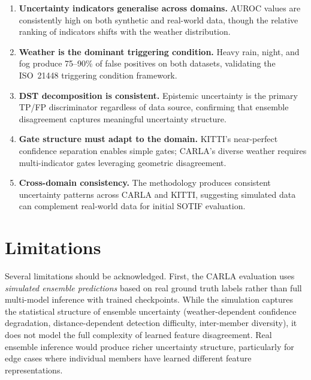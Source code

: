 \documentclass[conference]{IEEEtran}
\begin{document}
\begin{enumerate}
    \item \textbf{Uncertainty indicators generalise across domains.} AUROC values are consistently high on both synthetic and real-world data, though the relative ranking of indicators shifts with the weather distribution.

    \item \textbf{Weather is the dominant triggering condition.} Heavy rain, night, and fog produce 75--90\% of false positives on both datasets, validating the ISO~21448 triggering condition framework.

    \item \textbf{DST decomposition is consistent.} Epistemic uncertainty is the primary TP/FP discriminator regardless of data source, confirming that ensemble disagreement captures meaningful uncertainty structure.

    \item \textbf{Gate structure must adapt to the domain.} KITTI's near-perfect confidence separation enables simple gates; CARLA's diverse weather requires multi-indicator gates leveraging geometric disagreement.

    \item \textbf{Cross-domain consistency.} The methodology produces consistent uncertainty patterns across CARLA and KITTI, suggesting simulated data can complement real-world data for initial SOTIF evaluation.
\end{enumerate}


\section{Limitations}

Several limitations should be acknowledged. First, the CARLA evaluation uses \emph{simulated ensemble predictions} based on real ground truth labels rather than full multi-model inference with trained checkpoints. While the simulation captures the statistical structure of ensemble uncertainty (weather-dependent confidence degradation, distance-dependent detection difficulty, inter-member diversity), it does not model the full complexity of learned feature disagreement. Real ensemble inference would produce richer uncertainty structure, particularly for edge cases where individual members have learned different feature representations.
\end{document}
